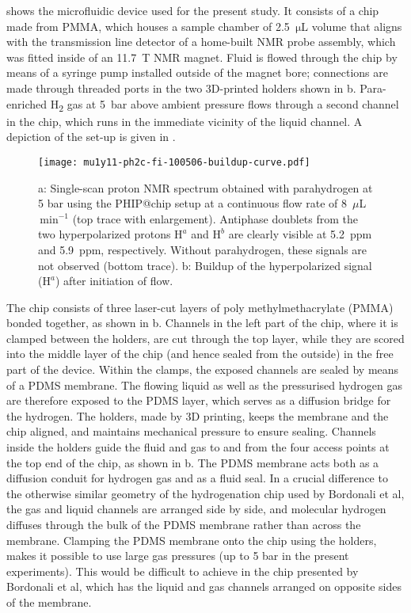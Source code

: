  shows the microfluidic device used for the
present study. It consists of a chip made from PMMA, which houses a sample
chamber of 2.5~$\mathrm{\mu L}$ volume that aligns with the transmission line
detector of a home-built NMR probe assembly, which was fitted inside of an
11.7~T NMR magnet.
Fluid is flowed through the chip by means of a syringe pump
installed outside of the magnet bore; connections are made through threaded
ports in the two 3D-printed holders shown in b.
Para-enriched H\textsubscript{2} gas at 5~bar above ambient pressure flows
through a second
channel in the chip, which runs in
the immediate vicinity of the liquid channel. A depiction of the set-up is given in .


\begin{figure}
	\centering
	\texttt{[image: mu1y11-ph2c-fi-100506-buildup-curve.pdf]}
	\caption{a: Single-scan proton NMR spectrum obtained with
  parahydrogen at 5 bar using the PHIP@chip setup at a continuous
  flow rate of 8~$\mu$L$\,\text{min}^{-1}$ (top trace with enlargement).
  Antiphase doublets from the two
	hyperpolarized protons $\mathrm{H}^a$  and $\mathrm{H}^{b}$ are
  clearly visible at 5.2~ppm and 5.9~ppm, respectively. Without
  parahydrogen, these signals are not observed (bottom trace).
	b: Buildup of the hyperpolarized signal ($\mathrm{H}^{a}$)
  after initiation of flow.
	}
	\label{fig:phip@chip2}
\end{figure}


The chip consists of three laser-cut layers of poly methylmethacrylate (PMMA)
bonded together, as shown in b. Channels in the
left part of the chip, where it is clamped between the holders, are cut through
the top layer, while they are scored into the middle layer of the chip (and
hence sealed from the outside) in the free part of the device.
Within the clamps, the exposed channels are sealed by means of a PDMS membrane.
The flowing liquid as well as
the pressurised hydrogen gas are therefore exposed to the PDMS layer,
which serves as a diffusion bridge for the hydrogen.
The holders, made by 3D printing, keeps the membrane and the chip aligned,
and maintains mechanical pressure to ensure sealing. Channels
inside the holders guide the fluid and gas to and from
the four access points at the top end
of the chip, as shown in b.
The PDMS membrane acts both as a diffusion conduit for hydrogen gas
and as a fluid seal.
In a crucial difference to the otherwise similar geometry of the
hydrogenation chip used by Bordonali et al\cite{Bordonali:2019jq},
the gas and liquid channels are arranged side by side, and molecular
hydrogen diffuses through the bulk of the PDMS membrane rather than across the
membrane. Clamping the PDMS membrane onto the chip using the
holders, makes it possible to use large gas pressures (up to 5 bar in
the present experiments). This would be difficult to achieve in the
chip presented by Bordonali et al, which has the liquid and gas channels
arranged on opposite sides of the membrane.

